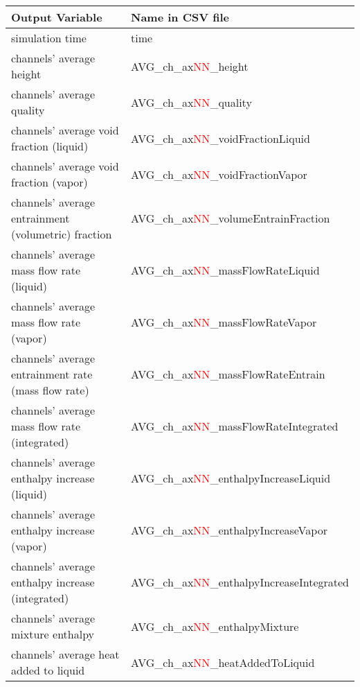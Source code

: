 \captionsetup{justification=centering}
\label{CSVvariableNames}
\begingroup
\scriptsize
\begin{longtable}{|l|l|}
\hline
\textbf{Output Variable} & \textbf{Name in CSV file} \\
\hline
\endhead
\hline
\endfoot
      \scriptsize {simulation time  }&\scriptsize{ time  } \\
      channels' average height  & AVG\_ch\_ax\textcolor{red}{NN}\_height \\
      channels' average quality  & AVG\_ch\_ax\textcolor{red}{NN}\_quality \\
      channels' average void fraction (liquid)  & AVG\_ch\_ax\textcolor{red}{NN}\_voidFractionLiquid \\
      channels' average void fraction (vapor)  & AVG\_ch\_ax\textcolor{red}{NN}\_voidFractionVapor \\
      channels' average entrainment (volumetric) fraction  & AVG\_ch\_ax\textcolor{red}{NN}\_volumeEntrainFraction \\
      channels' average mass flow rate (liquid)  & AVG\_ch\_ax\textcolor{red}{NN}\_massFlowRateLiquid \\
      channels' average mass flow rate (vapor)  & AVG\_ch\_ax\textcolor{red}{NN}\_massFlowRateVapor \\
      channels' average entrainment rate (mass flow rate)  & AVG\_ch\_ax\textcolor{red}{NN}\_massFlowRateEntrain \\
      channels' average mass flow rate (integrated)  & AVG\_ch\_ax\textcolor{red}{NN}\_massFlowRateIntegrated \\
      channels' average enthalpy increase (liquid)  & AVG\_ch\_ax\textcolor{red}{NN}\_enthalpyIncreaseLiquid \\
      channels' average enthalpy increase (vapor)  & AVG\_ch\_ax\textcolor{red}{NN}\_enthalpyIncreaseVapor \\
      channels' average enthalpy increase (integrated)  & AVG\_ch\_ax\textcolor{red}{NN}\_enthalpyIncreaseIntegrated \\
      channels' average mixture enthalpy  & AVG\_ch\_ax\textcolor{red}{NN}\_enthalpyMixture \\
      channels' average heat added to liquid & AVG\_ch\_ax\textcolor{red}{NN}\_heatAddedToLiquid \\

\end{longtable}
